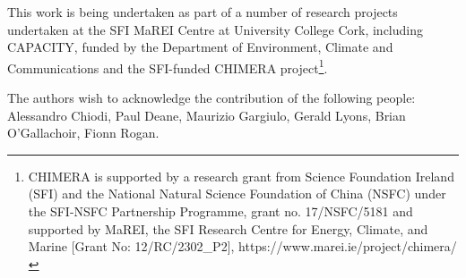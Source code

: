 \documentclass[gmd,manuscript]{copernicus}
\begin{document}


\begin{acknowledgements}
This work is being undertaken as part of a number of research projects undertaken at the SFI MaREI Centre at University College Cork, including CAPACITY, funded by the Department of Environment, Climate and Communications and the SFI-funded CHIMERA project\footnote{CHIMERA is supported by a research grant from Science Foundation Ireland (SFI) and the National Natural Science Foundation of China (NSFC) under the SFI-NSFC Partnership Programme, grant no. 17/NSFC/5181 and supported by MaREI, the SFI Research Centre for Energy, Climate, and Marine [Grant No: 12/RC/2302\_P2], https://www.marei.ie/project/chimera/}.

The authors wish to acknowledge the contribution of the following people: Alessandro Chiodi, Paul Deane, Maurizio Gargiulo, Gerald Lyons, Brian O'Gallachoir, Fionn Rogan.
\end{acknowledgements}












\end{document}
